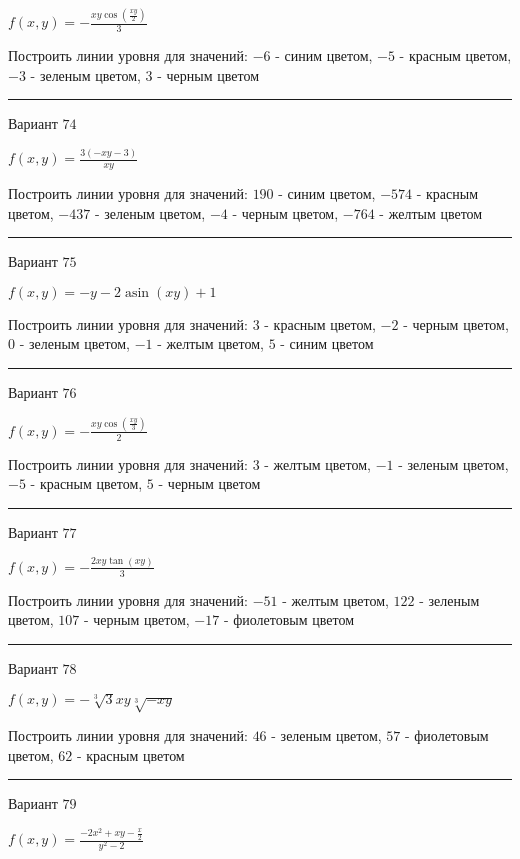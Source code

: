 \documentclass[11pt]{report}
\begin{document}
$f(x, y) = - \frac{x y \cos{\left(\frac{x y}{2} \right)}}{3}$

Построить линии уровня для значений: $-6$ - синим цветом, $-5$ - красным цветом, $-3$ - зеленым цветом, $3$ - черным цветом
\begin{center}
\noindent\rule{8cm}{0.4pt}
\end{center}
Вариант $74$


$f(x, y) = \frac{3 \left(- x y - 3\right)}{x y}$

Построить линии уровня для значений: $190$ - синим цветом, $-574$ - красным цветом, $-437$ - зеленым цветом, $-4$ - черным цветом, $-764$ - желтым цветом
\begin{center}
\noindent\rule{8cm}{0.4pt}
\end{center}
Вариант $75$


$f(x, y) = - y - 2 \operatorname{asin}{\left(x y \right)} + 1$

Построить линии уровня для значений: $3$ - красным цветом, $-2$ - черным цветом, $0$ - зеленым цветом, $-1$ - желтым цветом, $5$ - синим цветом
\begin{center}
\noindent\rule{8cm}{0.4pt}
\end{center}
Вариант $76$


$f(x, y) = - \frac{x y \cos{\left(\frac{x y}{3} \right)}}{2}$

Построить линии уровня для значений: $3$ - желтым цветом, $-1$ - зеленым цветом, $-5$ - красным цветом, $5$ - черным цветом
\begin{center}
\noindent\rule{8cm}{0.4pt}
\end{center}
Вариант $77$


$f(x, y) = - \frac{2 x y \tan{\left(x y \right)}}{3}$

Построить линии уровня для значений: $-51$ - желтым цветом, $122$ - зеленым цветом, $107$ - черным цветом, $-17$ - фиолетовым цветом
\begin{center}
\noindent\rule{8cm}{0.4pt}
\end{center}
Вариант $78$


$f(x, y) = - \sqrt[3]{3} x y \sqrt[3]{- x y}$

Построить линии уровня для значений: $46$ - зеленым цветом, $57$ - фиолетовым цветом, $62$ - красным цветом
\begin{center}
\noindent\rule{8cm}{0.4pt}
\end{center}
Вариант $79$


$f(x, y) = \frac{- 2 x^{2} + x y - \frac{x}{2}}{y^{2} - 2}$
\end{document}
